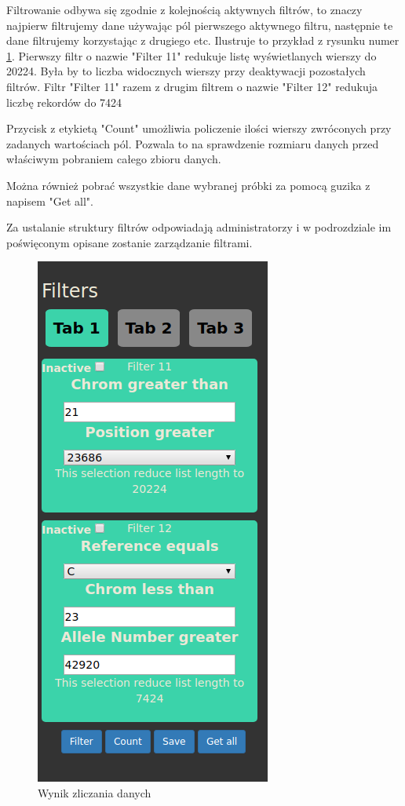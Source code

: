\documentclass[a4paper,12pt,twoside]{article}
\begin{document}
\newpage

Filtrowanie odbywa się zgodnie z kolejnością aktywnych filtrów, to znaczy najpierw filtrujemy
dane używając pól pierwszego aktywnego filtru, następnie te dane filtrujemy korzystając z drugiego etc. Ilustruje to przykład z rysunku numer \ref{fig:countpic}. Pierwszy filtr o nazwie "Filter 11" redukuje listę wyświetlanych wierszy do 20224. Była by to liczba widocznych wierszy przy deaktywacji pozostałych filtrów. Filtr "Filter 11" razem z drugim filtrem o nazwie "Filter 12"
redukuja liczbę rekordów do 7424

Przycisk z etykietą "Count" umożliwia policzenie ilości wierszy zwróconych przy zadanych wartościach pól. Pozwala to na sprawdzenie rozmiaru danych przed właściwym pobraniem całego zbioru danych.

Można również pobrać wszystkie dane wybranej próbki za pomocą guzika z napisem "Get all".

Za ustalanie struktury filtrów odpowiadają administratorzy i w podrozdziale im poświęconym
opisane zostanie zarządzanie filtrami.


\begin{figure}
  \centering
  \includegraphics{obrazy/aplikacja/count.png}
  \caption{Wynik zliczania danych}
  \label{fig:countpic}
\end{figure}
\end{document}
